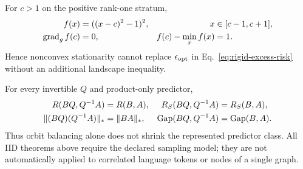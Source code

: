 \begin{proposition}
For $c>1$ on the positive rank-one stratum,
\begin{align}
f(x)&=((x-c)^2-1)^2,& x&\in[c-1,c+1],\\
\operatorname{grad}_g f(c)&=0,&
f(c)-\min_x f(x)&=1 .
\end{align}
Hence nonconvex stationarity cannot replace $\epsilon_{\rm opt}$ in
Eq.~\eqref{eq:rigid-excess-risk} without an additional landscape inequality.
\end{proposition}

\begin{proposition}
For every invertible $Q$ and product-only predictor,
\begin{align}
R(BQ,Q^{-1}A)&=R(B,A),&
R_S(BQ,Q^{-1}A)&=R_S(B,A),\\
\|(BQ)(Q^{-1}A)\|_*&=\|BA\|_*,&
{\rm Gap}(BQ,Q^{-1}A)&={\rm Gap}(B,A).
\end{align}
Thus orbit balancing alone does not shrink the represented predictor class.
All IID theorems above require the declared sampling model; they are not
automatically applied to correlated language tokens or nodes of a single graph.
\end{proposition}
